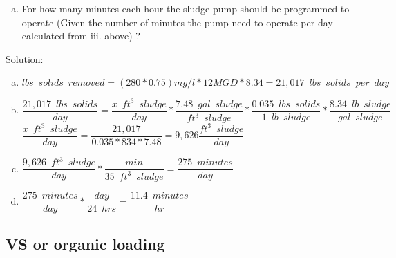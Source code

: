 \begin{enumerate}
\begin{enumerate}[a.]
                                \item For how many minutes each hour the sludge pump should be programmed to operate (Given the number of minutes the pump need to operate per day calculated from iii. above) ?\\
                            \end{enumerate}
                        Solution:\\
                            \begin{enumerate}[a.]
                                \item $lbs \enspace solids \enspace removed=(280*0.75)mg/l*12MGD*8.34=\boxed{21,017 \enspace lbs \enspace solids \enspace per \enspace day}$\\
                                \vspace{0.5cm}
                                \item $\dfrac{21,017 \enspace lbs \enspace solids}{day} = \dfrac{x \enspace ft^3 \enspace sludge}{day} *\dfrac{7.48 \enspace gal \enspace sludge}{ft^3 \enspace sludge}* \dfrac{0.035 \enspace lbs \enspace solids}{1 \enspace  {lb \enspace sludge}}*\dfrac{8.34 \enspace lb \enspace sludge}{gal \enspace sludge}$\\
                                \vspace{0.5cm}
                                $\dfrac{x \enspace ft^3\enspace sludge}{day}= \dfrac{21,017}{0.035*834*7.48}=\boxed{9,626\dfrac{ft^3 \enspace sludge}{day}} $\\
                                \vspace{0.5cm}
                                \item $\dfrac{9,626 \enspace ft^3 \enspace sludge}{day}*\dfrac{min}{35 \enspace ft^3 \enspace sludge}=\boxed{\dfrac{275 \enspace minutes}{day}}$\\
                                \vspace{0.5cm}
                                \item $\dfrac{275 \enspace minutes}{day}*\dfrac{day}{24 \enspace hrs}=\boxed{\dfrac{11.4 \enspace minutes}{hr}}$\\
                            \end{enumerate}
            
                \end{enumerate}
                
\subsection{VS or organic loading}                

